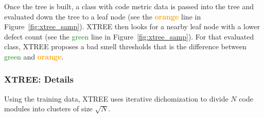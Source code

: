 \documentclass[twocolumn,5p]{elsarticle}
\newcommand{\fig}[1]{Figure~\ref{fig:#1}}
\theoremstyle{break}
\begin{document}
     Once the tree is built, a class with code metric data is passed into the tree and evaluated down the tree to a leaf node (see the \textcolor{orange}{{\bf orange}} line in \fig{xtree_samp}).
      XTREE then looks for a nearby leaf node with a lower defect
      count (see the \textcolor{green}{{green}} line in \fig{xtree_samp}). For that evaluated class, XTREE proposes a bad smell
      thresholds that is  the difference between 
      \textcolor{green}{{green}} and \textcolor{orange}{{\bf orange}}. 
  
  
\subsubsection{XTREE:   Details}

Using the training data,  XTREE uses  
iterative dichomization to
  divide  $N$ code modules  into  clusters of
size $\sqrt{N}$.
\end{document}
